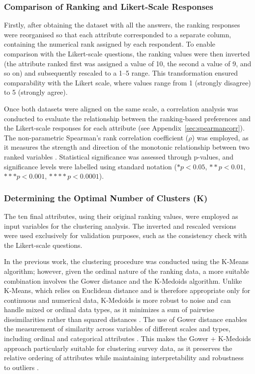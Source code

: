 \documentclass[a4paper, 12pt, twoside]{report}  %
\begin{document}
\subsubsection{Comparison of Ranking and Likert-Scale Responses}

\indent Firstly, after obtaining the dataset with all the answers, the ranking responses were reorganised so that each attribute corresponded to a separate column, containing the numerical rank assigned by each respondent. To enable comparison with the Likert-scale questions, the ranking values were then inverted (the attribute ranked first was assigned a value of 10, the second a value of 9, and so on) and subsequently rescaled to a 1–5 range. This transformation ensured comparability with the Likert scale, where values range from 1 (strongly disagree) to 5 (strongly agree). 

\indent Once both datasets were aligned on the same scale, a correlation analysis was conducted to evaluate the relationship between the ranking-based preferences and the Likert-scale responses for each attribute (see Appendix~\ref{sec:spearmancorr}). The non-parametric Spearman’s rank correlation coefficient (\(\rho\)) was employed, as it measures the strength and direction of the monotonic relationship between two ranked variables \cite{spearman}. Statistical significance was assessed through p-values, and significance levels were labelled using standard notation (\(*p < 0.05\), \(**p < 0.01\), \(***p < 0.001\), \(****p < 0.0001\)).

\subsubsection{Determining the Optimal Number of Clusters (K)}

\indent The ten final attributes, using their original ranking values, were employed as input variables for the clustering analysis. The inverted and rescaled versions were used exclusively for validation purposes, such as the consistency check with the Likert-scale questions.

\indent In the previous work, the clustering procedure was conducted using the K-Means algorithm; however, given the ordinal nature of the ranking data, a more suitable combination involves the Gower distance and the K-Medoids algorithm. Unlike K-Means, which relies on Euclidean distance and is therefore appropriate only for continuous and numerical data, K-Medoids is more robust to noise and can handle mixed or ordinal data types, as it minimizes a sum of pairwise dissimilarities rather than squared distances \cite{KaufmanRousseeuw1990}. The use of Gower distance enables the measurement of similarity across variables of different scales and types, including ordinal and categorical attributes \cite{Gower1971}. This makes the Gower + K-Medoids approach particularly suitable for clustering survey data, as it preserves the relative ordering of attributes while maintaining interpretability and robustness to outliers \cite{Hennig2015, Podani1999}.
\end{document}
